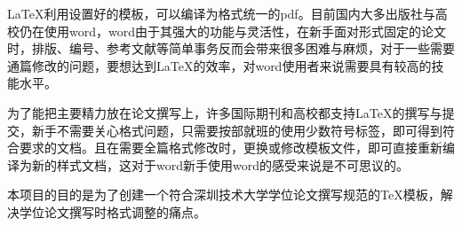 


\begin{abstractcn}
LaTeX利用设置好的模板，可以编译为格式统一的pdf。目前国内大多出版社与高校仍在使用word，word由于其强大的功能与灵活性，在新手面对形式固定的论文时，排版、编号、参考文献等简单事务反而会带来很多困难与麻烦，对于一些需要通篇修改的问题，要想达到LaTeX的效率，对word使用者来说需要具有较高的技能水平。

为了能把主要精力放在论文撰写上，许多国际期刊和高校都支持LaTeX的撰写与提交，新手不需要关心格式问题，只需要按部就班的使用少数符号标签，即可得到符合要求的文档。且在需要全篇格式修改时，更换或修改模板文件，即可直接重新编译为新的样式文档，这对于word新手使用word的感受来说是不可思议的。

本项目的目的是为了创建一个符合深圳技术大学学位论文撰写规范的TeX模板，解决学位论文撰写时格式调整的痛点。


\end{abstractcn}